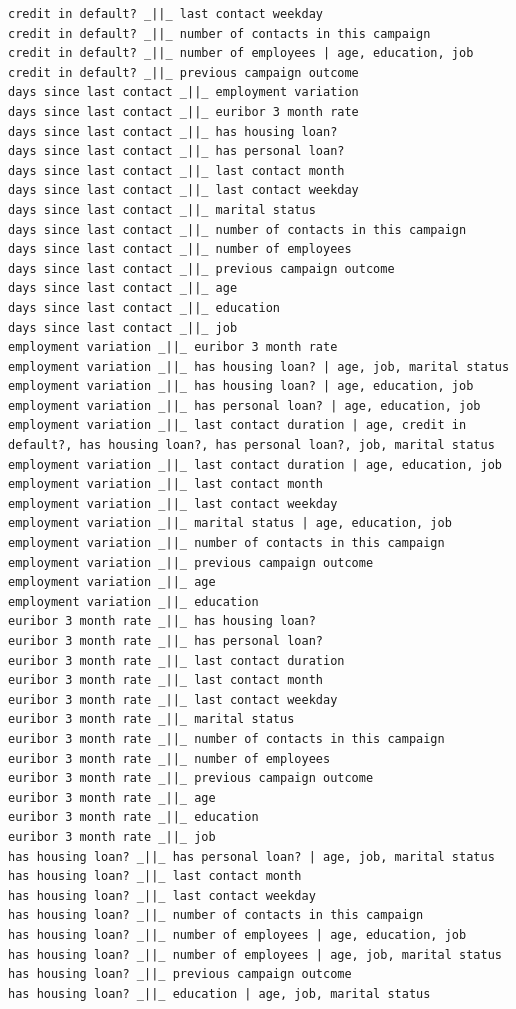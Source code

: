 \documentclass[11pt,]{article}
\begin{document}
\begin{verbatim}
credit in default? _||_ last contact weekday
credit in default? _||_ number of contacts in this campaign
credit in default? _||_ number of employees | age, education, job
credit in default? _||_ previous campaign outcome
days since last contact _||_ employment variation
days since last contact _||_ euribor 3 month rate
days since last contact _||_ has housing loan?
days since last contact _||_ has personal loan?
days since last contact _||_ last contact month
days since last contact _||_ last contact weekday
days since last contact _||_ marital status
days since last contact _||_ number of contacts in this campaign
days since last contact _||_ number of employees
days since last contact _||_ previous campaign outcome
days since last contact _||_ age
days since last contact _||_ education
days since last contact _||_ job
employment variation _||_ euribor 3 month rate
employment variation _||_ has housing loan? | age, job, marital status
employment variation _||_ has housing loan? | age, education, job
employment variation _||_ has personal loan? | age, education, job
employment variation _||_ last contact duration | age, credit in default?, has housing loan?, has personal loan?, job, marital status
employment variation _||_ last contact duration | age, education, job
employment variation _||_ last contact month
employment variation _||_ last contact weekday
employment variation _||_ marital status | age, education, job
employment variation _||_ number of contacts in this campaign
employment variation _||_ previous campaign outcome
employment variation _||_ age
employment variation _||_ education
euribor 3 month rate _||_ has housing loan?
euribor 3 month rate _||_ has personal loan?
euribor 3 month rate _||_ last contact duration
euribor 3 month rate _||_ last contact month
euribor 3 month rate _||_ last contact weekday
euribor 3 month rate _||_ marital status
euribor 3 month rate _||_ number of contacts in this campaign
euribor 3 month rate _||_ number of employees
euribor 3 month rate _||_ previous campaign outcome
euribor 3 month rate _||_ age
euribor 3 month rate _||_ education
euribor 3 month rate _||_ job
has housing loan? _||_ has personal loan? | age, job, marital status
has housing loan? _||_ last contact month
has housing loan? _||_ last contact weekday
has housing loan? _||_ number of contacts in this campaign
has housing loan? _||_ number of employees | age, education, job
has housing loan? _||_ number of employees | age, job, marital status
has housing loan? _||_ previous campaign outcome
has housing loan? _||_ education | age, job, marital status

\end{verbatim}
\end{document}
